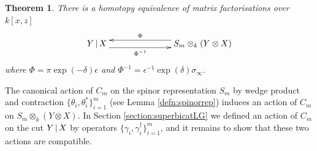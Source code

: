 \documentclass[english,letter paper,12pt,leqno]{article}
\newtheorem{theorem}{Theorem}[section]
\theoremstyle{example}
\numberwithin{equation}{section}
\begin{document}
\begin{theorem}\label{theorem:htpy_equivalence_main} There is a homotopy equivalence of matrix factorisations over $k[x,z]$
\begin{equation}\label{eq:final_finite_model}
\xymatrix@C+4pc{
Y \l X \ar@<-1ex>[r]_-{\Phi^{-1}} & S_m \otimes_k ( Y \otimes X )\ar@<-1ex>[l]_-{\Phi}
}
\end{equation}
where $\Phi = \pi \exp(-\delta) \epsilon$ and $\Phi^{-1} = \epsilon^{-1} \exp(\delta) \sigma_\infty$.
\end{theorem}

The canonical action of $C_m$ on the spinor representation $S_m$ by wedge product and contraction $\{ \theta_i, \theta_i^* \}_{i=1}^m$ (see Lemma \ref{defn:spinorrep}) induces an action  of $C_m$ on $S_m \otimes_k ( Y \otimes X )$. In Section \ref{section:superbicatLG} we defined an action of $C_m$ on the cut $Y \,|\, X$ by operators $\{ \gamma_i, \gamma_i^\dagger \}_{i=1}^m$, and it remains to show that these two actions are compatible.
\end{document}
